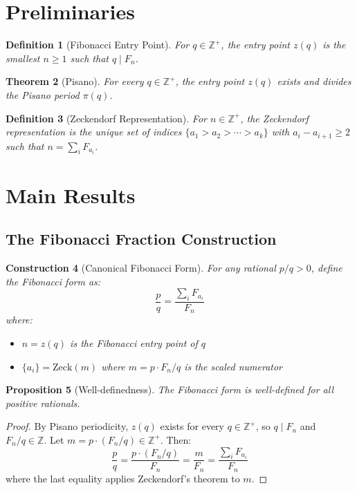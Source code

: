 \documentclass[11pt]{article}
\newtheorem{theorem}{Theorem}
\newtheorem{proposition}[theorem]{Proposition}
\newtheorem{definition}[theorem]{Definition}
\newtheorem{construction}[theorem]{Construction}
\begin{document}
\section{Preliminaries}

\begin{definition}[Fibonacci Entry Point]
For $q \in \mathbb{Z}^+$, the entry point $z(q)$ is the smallest $n \geq 1$ such that $q \mid F_n$.
\end{definition}

\begin{theorem}[Pisano]
For every $q \in \mathbb{Z}^+$, the entry point $z(q)$ exists and divides the Pisano period $\pi(q)$.
\end{theorem}

\begin{definition}[Zeckendorf Representation]
For $n \in \mathbb{Z}^+$, the Zeckendorf representation is the unique set of indices $\{a_1 > a_2 > \cdots > a_k\}$ with $a_i - a_{i+1} \geq 2$ such that $n = \sum_i F_{a_i}$.
\end{definition}

\section{Main Results}

\subsection{The Fibonacci Fraction Construction}

\begin{construction}[Canonical Fibonacci Form]
\label{con:main}
For any rational $p/q > 0$, define the \emph{Fibonacci form} as:
\[
\frac{p}{q} = \frac{\sum_{i} F_{a_i}}{F_n}
\]
where:
\begin{itemize}
    \item $n = z(q)$ is the Fibonacci entry point of $q$
    \item $\{a_i\} = \mathrm{Zeck}(m)$ where $m = p \cdot F_n/q$ is the \emph{scaled numerator}
\end{itemize}
\end{construction}

\begin{proposition}[Well-definedness]
\label{prop:welldef}
The Fibonacci form is well-defined for all positive rationals.
\end{proposition}

\begin{proof}
By Pisano periodicity, $z(q)$ exists for every $q \in \mathbb{Z}^+$, so $q \mid F_n$ and $F_n/q \in \mathbb{Z}$. Let $m = p \cdot (F_n/q) \in \mathbb{Z}^+$. Then:
\[
\frac{p}{q} = \frac{p \cdot (F_n/q)}{F_n} = \frac{m}{F_n} = \frac{\sum_i F_{a_i}}{F_n}
\]
where the last equality applies Zeckendorf's theorem to $m$.
\end{proof}
\end{document}
